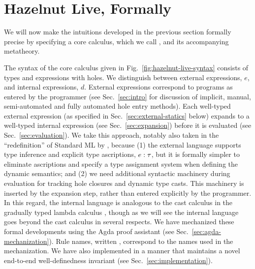 
\clearpage
\newcommand{\calculusSec}{Hazelnut Live, Formally}
\section{\protect\calculusSec}
\label{sec:calculus}





We will now make the intuitions developed in the previous section formally precise by specifying a core calculus, which we call \HazelnutLive, and its accompanying metatheory.

 The syntax of the core calculus given in Fig.~\ref{fig:hazelnut-live-syntax} consists of types and expressions with holes. 
We distinguish between {external} expressions, $e$, and {internal} expressions, $d$. 
External expressions correspond to programs as entered by the programmer 
(see Sec.~\ref{sec:intro} for discussion of implicit, manual, semi-automated and fully automated hole entry methods). 
Each well-typed external expression (as specified in Sec.~\ref{sec:external-statics} below) expands to a well-typed internal expression (see Sec.~\ref{sec:expansion}) before it is evaluated (see Sec.~\ref{sec:evaluation}). 
We take this approach, notably also taken in the ``redefinition'' of Standard ML by \citet{Harper00atype-theoretic}, because (1) the external language supports type inference and explicit type ascriptions, $e : \tau$, but it is formally simpler to eliminate ascriptions and specify a type assignment system when defining the dynamic semantics; and 
(2) we need additional syntactic machinery during evaluation for tracking hole closures and dynamic type casts. 
This machinery is inserted by the expansion step, rather than entered explicitly by the programmer. 
In this regard, the internal language is analogous to the cast calculus in the gradually typed lambda calculus \cite{DBLP:conf/snapl/SiekVCB15,Siek06a}, though as we will see the \HazelnutLive internal language goes beyond the cast calculus in several respects. We have mechanized these formal developments using the Agda proof assistant \cite{norell:thesis,norell2009dependently} 
(see Sec.~\ref{sec:agda-mechanization}). Rule names, written , correspond to the names used in the mechanization. We have also implemented \HazelnutLive in a manner that maintains a novel end-to-end well-definedness invariant (see Sec.~\ref{sec:implementation}).

